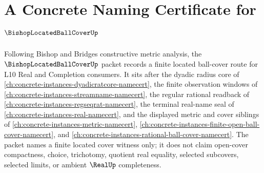 \chapter{A Concrete Naming Certificate for $\BishopLocatedBallCoverUp$}
\label{ch:concrete-instances-bishop-located-ball-cover-namecert}

Following Bishop and Bridges constructive metric analysis, the $\BishopLocatedBallCoverUp$ packet records a finite located ball-cover route for L10 Real and Completion consumers. It sits after the dyadic radius core of \autoref{ch:concrete-instances-dyadicratcore-namecert}, the finite observation windows of \autoref{ch:concrete-instances-streamname-namecert}, the regular rational readback of \autoref{ch:concrete-instances-regseqrat-namecert}, the terminal real-name seal of \autoref{ch:concrete-instances-real-namecert}, and the displayed metric and cover siblings of \autoref{ch:concrete-instances-metric-namecert}, \autoref{ch:concrete-instances-finite-open-ball-cover-namecert}, and \autoref{ch:concrete-instances-rational-ball-cover-namecert}. The packet names a finite located cover witness only; it does not claim open-cover compactness, choice, trichotomy, quotient real equality, selected subcovers, selected limits, or ambient $\RealUp$ completeness.

